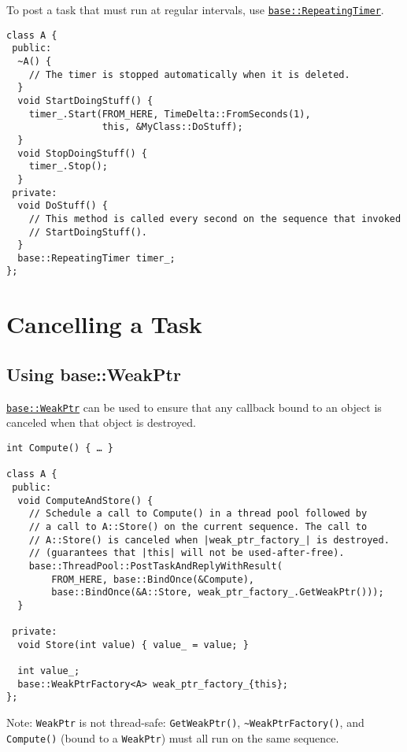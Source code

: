 \documentclass[a4paper,12pt,notitlepage,twoside,openright]{article}
\begin{document}
To post a task that must run at regular intervals, use
\href{https://cs.chromium.org/chromium/src/base/timer/timer.h}{\texttt{base::RepeatingTimer}}.

\begin{verbatim}
class A {
 public:
  ~A() {
    // The timer is stopped automatically when it is deleted.
  }
  void StartDoingStuff() {
    timer_.Start(FROM_HERE, TimeDelta::FromSeconds(1),
                 this, &MyClass::DoStuff);
  }
  void StopDoingStuff() {
    timer_.Stop();
  }
 private:
  void DoStuff() {
    // This method is called every second on the sequence that invoked
    // StartDoingStuff().
  }
  base::RepeatingTimer timer_;
};
\end{verbatim}

\hypertarget{cancelling-a-task}{%
\section{Cancelling a Task}\label{cancelling-a-task}}

\hypertarget{using-baseweakptr}{%
\subsection{Using base::WeakPtr}\label{using-baseweakptr}}

\href{https://cs.chromium.org/chromium/src/base/memory/weak_ptr.h}{\texttt{base::WeakPtr}}
can be used to ensure that any callback bound to an object is canceled
when that object is destroyed.

\begin{verbatim}
int Compute() { … }

class A {
 public:
  void ComputeAndStore() {
    // Schedule a call to Compute() in a thread pool followed by
    // a call to A::Store() on the current sequence. The call to
    // A::Store() is canceled when |weak_ptr_factory_| is destroyed.
    // (guarantees that |this| will not be used-after-free).
    base::ThreadPool::PostTaskAndReplyWithResult(
        FROM_HERE, base::BindOnce(&Compute),
        base::BindOnce(&A::Store, weak_ptr_factory_.GetWeakPtr()));
  }

 private:
  void Store(int value) { value_ = value; }

  int value_;
  base::WeakPtrFactory<A> weak_ptr_factory_{this};
};
\end{verbatim}

Note: \texttt{WeakPtr} is not thread-safe: \texttt{GetWeakPtr()},
\texttt{\textasciitilde{}WeakPtrFactory()}, and \texttt{Compute()}
(bound to a \texttt{WeakPtr}) must all run on the same sequence.
\end{document}
